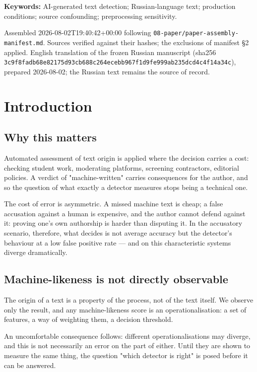 \documentclass[11pt,a4paper]{article}
\renewcommand{\_}{\textunderscore\allowbreak}
\begin{document}
\noindent\textbf{Keywords:} AI-generated text detection; Russian-language text; production conditions; source confounding; preprocessing sensitivity.\par\bigskip
{\footnotesize Assembled 2026-08-02T19:40:42+00:00 following \texttt{08-\allowbreak{}paper/paper-\allowbreak{}assembly-\allowbreak{}manifest.md}. Sources verified against their hashes; the exclusions of manifest §2 applied. English translation of the frozen Russian manuscript (sha256 \texttt{3c9f8fadb68e82175d93cb688c264ecebb967f1d9fe999ab235dcd4c4f14a34c}), prepared 2026-08-02; the Russian text remains the source of record.\par}

\section{Introduction}

\subsection{Why this matters}

Automated assessment of text origin is applied where the decision carries a cost:
checking student work, moderating platforms, screening contractors, editorial
policies. A verdict of "machine-written" carries consequences for the author, and
so the question of what exactly a detector measures stops being a technical one.

The cost of error is asymmetric. A missed machine text is cheap; a false
accusation against a human is expensive, and the author cannot defend against it:
proving one's own authorship is harder than disputing it. In the accusatory scenario,
therefore, what decides is not average accuracy but the detector's behaviour at a
low false positive rate — and on this characteristic systems diverge dramatically.

\subsection{Machine-likeness is not directly observable}

The origin of a text is a property of the process, not of the text itself. We observe
only the result, and any machine-likeness score is an operationalisation: a set of
features, a way of weighting them, a decision threshold.

An uncomfortable consequence follows: different operationalisations may diverge,
and this is not necessarily an error on the part of either. Until they are shown to
measure the same thing, the question "which detector is right" is posed before it
can be answered.
\end{document}
